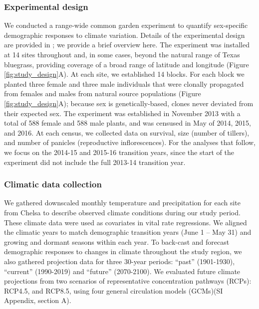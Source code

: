 \documentclass[9pt,twocolumn,twoside,lineno]{pnas-new}
\newcommand{\revise}[1]{{\color{Mahogany}{#1}}}
\begin{document}
\subsubsection*{Experimental design}
We conducted a range-wide common garden experiment to quantify sex-specific demographic responses to climate variation. 
Details of the experimental design are provided in \cite{miller2022two}; we provide a brief overview here. 
The experiment was installed at 14 sites throughout and, in some cases, beyond the natural range of Texas bluegrass, providing coverage of a broad range of latitude and longitude (Figure \ref{fig:study_design}A).
At each site, we established 14 blocks. 
For each block we planted three female and three male individuals that were clonally propagated from females and males from \revise{\linelabel{sourcepop} seven} natural source populations (Figure \ref{fig:study_design}A); because sex is genetically-based, clones never deviated from their expected sex. 
The experiment was established in November 2013 with a total of 588 female and 588 male plants, and was censused in May of 2014, 2015, and 2016. 
At each census, we collected data on survival, size (number of tillers), and number of panicles (reproductive inflorescences). 
For the analyses that follow, we focus on the 2014-15 and 2015-16 transition years, since the start of the experiment did not include the full 2013-14 transition year. 

\subsubsection*{Climatic data collection}
We gathered downscaled monthly temperature and precipitation for each site from Chelsa \citep{karger2017climatologies} to describe observed climate conditions during our study period.
These climate data were used as covariates in vital rate regressions. 
We aligned the climatic years to match demographic transition years (June 1 -- May 31) and growing and dormant seasons within each year.
To back-cast and forecast demographic responses to changes in climate throughout the study region, we also gathered projection data for three 30-year periods: ``past'' (1901-1930), ``current'' (1990-2019) and ``future'' (2070-2100).
We evaluated future climate projections from two scenarios of representative concentration pathways (RCPs): RCP4.5, and RCP8.5, using four general circulation models (GCMs)(SI Appendix, section A). 
\end{document}
